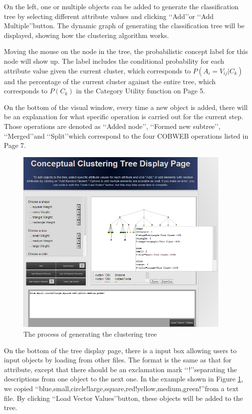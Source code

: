 On the left, one or multiple objects can be added to generate the classification tree by selecting different attribute values and clicking \lq\lq{Add}\rq\rq or \lq\lq{Add Multiple}\rq\rq button. The dynamic graph of generating the classification tree will be displayed, showing how the clustering algorithm works. 
     
Moving the mouse on the node in the tree, the probabilistic concept label for this node will show up. The label includes the conditional probability for each attribute value given the current cluster, which corresponds to $P(A_i=V_{ij}\left|C_k\right.)$ and the percentage of the current cluster against the entire tree, which corresponds to $P(C_k)$ in the Category Utility function on Page 5. 

On the bottom of the visual window, every time a new object is added, there will be an explanation for what specific operation is carried out for the current step. Those operations are denoted as \lq\lq{Added node}\rq\rq, \lq\lq{Formed new subtree}\rq\rq, \lq\lq{Merged}\rq\rq and \lq\lq{Split}\rq\rq which correspond to the four COBWEB operations listed in Page 7.
    \begin{figure}[h!]
           \centering
           \includegraphics[width=300pt]{../images/interface3.jpg}
           \caption{The process of generating the clustering tree}
           \label{Fig:intf3}
     \end{figure}    
     
On the bottom of the tree display page, there is a input box allowing users to input objects by loading from other files. The format is the same as that for attribute, except that there should be an exclamation mark \lq\lq{!}\rq\rq separating the descriptions from one object to the next one. In the example shown in Figure \ref{Fig:intf3}, we copied \lq\lq{blue,small,circle!large,square,red!yellow,medium,green!}\rq\rq from a text file. By clicking \lq\lq{Load Vector Values}\rq\rq button, these objects will be added to the tree.


